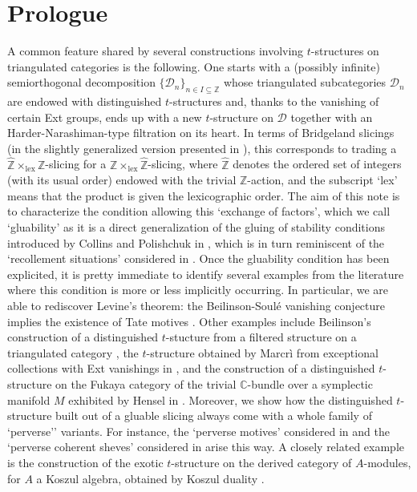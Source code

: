 \documentclass{article}
\theoremstyle{definition}
\newcommand{\Z}{\mathbb{Z}}
\begin{document}
\section{Prologue}
A common feature shared by several constructions involving $t$-structures on triangulated categories is the following. One starts with a (possibly infinite) semiorthogonal decomposition $\{\mathscr{D}_n\}_{n\in I\subseteq \Z}$ whose triangulated subcategories $\mathscr{D}_n$ are endowed with distinguished $t$-structures and, thanks to the vanishing of certain Ext groups, ends up with a new $t$-structure on $\mathscr{D}$ together with an Harder-Narashiman-type filtration on its heart. In terms of Bridgeland slicings (in the slightly generalized version presented in \cite{gkr,fosco}), this corresponds to trading a $\hat{\Z}\times_{\mathrm{lex}}\Z$-slicing for a ${\Z}\times_{\mathrm{lex}}\hat{\Z}$-slicing, where $\hat{\Z}$ denotes the ordered set of integers (with its usual order) endowed with the trivial $\Z$-action, and the subscript `lex' means that the product is given the lexicographic order. The aim of this note is to characterize the condition allowing this `exchange of factors', which we call `gluability' {\color{red}as it is a direct generalization of the gluing of stability conditions introduced by Collins and Polishchuk in \cite{collins}, which is in turn} reminiscent of the `recollement situations' considered in \cite{bbd}. Once the gluability condition has been explicited, it is pretty immediate to identify several examples from the literature where this condition is more or less implicitly occurring. In particular, we are able to rediscover Levine's theorem: the Beilinson-Soul\'e vanishing conjecture implies the existence of Tate motives \cite{levine}. 
Other examples include Beilinson's construction of a distinguished $t$-stucture from a filtered structure on a triangulated category \cite{beil}, the $t$-structure obtained by Marcr\`i from exceptional collections with Ext vanishings in \cite{macri}, and the construction of a distinguished $t$-structure on the Fukaya category of the trivial $\mathbb{C}$-bundle over a symplectic manifold $M$ exhibited by Hensel in \cite{lagra}. Moreover, we show how the distinguished $t$-structure built out of a gluable slicing always come with a whole family of `perverse'' variants. For instance, the `perverse  motives' considered in \cite{permot} and the `perverse coherent sheves' considered in \cite{bezr} arise this way. A closely related example is the construction of the exotic $t$-structure on the derived category of $A$-modules, for $A$ a Koszul algebra, obtained by Koszul duality \cite{kosz}.
\end{document}
